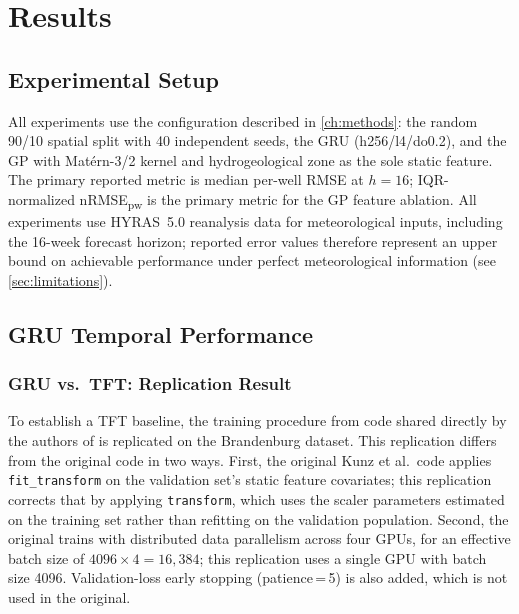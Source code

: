 
\chapter{Results}
\label{ch:results}

\section{Experimental Setup}
\label{sec:exp_setup}

All experiments use the configuration described in \cref{ch:methods}: the random 90/10 spatial split with 40 independent seeds, the GRU (h256/l4/do0.2), and the GP with Matérn-3/2 kernel and hydrogeological zone as the sole static feature. The primary reported metric is median per-well RMSE at $h=16$; IQR-normalized nRMSE\textsubscript{pw} is the primary metric for the GP feature ablation.
All experiments use HYRAS~5.0 reanalysis data for meteorological inputs, including the 16-week forecast horizon; reported error values therefore represent an upper bound on achievable performance under perfect meteorological information (see \cref{sec:limitations}).

\section{GRU Temporal Performance}
\label{sec:gru_performance}

\subsection{GRU vs.\ TFT: Replication Result}
\label{sec:gru_results}

To establish a TFT baseline, the training procedure from code shared directly
by the authors of \citet{kunz2025} is replicated on the Brandenburg dataset. This replication differs from
the original code in two ways. First, the original Kunz et al.\ code applies \texttt{fit\_transform} on the
validation set's static feature covariates; this replication corrects that by applying \texttt{transform},
which uses the scaler parameters estimated on the training set rather than refitting on the validation population.
Second, the original trains with distributed
data parallelism across four GPUs, for an effective batch size of
$4096 \times 4 = 16{,}384$; this replication uses a single GPU with batch size 4096.
Validation-loss early stopping (patience\,=\,5) is also added, which is not used in
the original.

